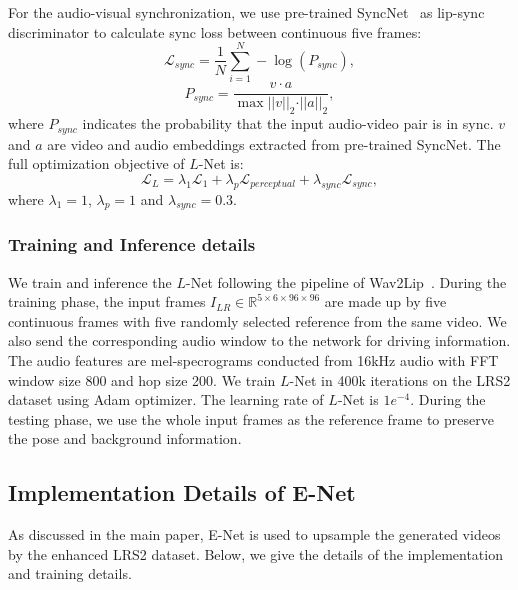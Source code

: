 For the audio-visual synchronization, we use pre-trained SyncNet~\cite{wav2lip, syncnet} as lip-sync discriminator to calculate sync loss between continuous five frames:
\begin{equation}
\mathcal{L}_{sync} = \frac{1}{N} \sum_{i=1}^N -\log(P_{sync}),
\end{equation}
\begin{equation}
P_{sync}=\frac{v\cdot a}{\max{\vert\vert v \vert\vert_2 \cdot \vert\vert a \vert\vert_2}},
\end{equation}
\noindent where $P_{sync}$ indicates the probability that the input audio-video pair is in sync. $v$ and $a$ are video and audio embeddings extracted from pre-trained SyncNet.
The full optimization objective of $L$-Net is:
\begin{equation}
\mathcal{L}_{L} = \lambda_{1} \mathcal{L}_{1} + \lambda_{p} \mathcal{L}_{perceptual} + \lambda_{sync} \mathcal{L}_{sync},
\end{equation}
\noindent where $\lambda_{1}=1$, $\lambda_{p}=1$ and $\lambda_{sync}=0.3$.

\subsubsection{Training and Inference details}
We train and inference the $L$-Net following the pipeline of Wav2Lip~\cite{wav2lip}. During the training phase, the input frames $I_{LR} \in \mathbb{R}^{5\times6\times96\times96}$ are made up by five continuous frames with five randomly selected reference from the same video. We also send the corresponding audio window to the network for driving information. 
The audio features are mel-specrograms conducted from 16kHz audio with FFT window size 800 and hop size 200. We train $L$-Net in 400k iterations on the LRS2 dataset using Adam optimizer. The learning rate of $L$-Net is $1e^{-4}$. 
During the testing phase, we use the whole input frames as the reference frame to preserve the pose and background information.


\subsection{Implementation Details of E-Net}
As discussed in the main paper, E-Net is used to upsample the generated videos by the enhanced LRS2 dataset. Below, we give the details of the implementation and training details.

